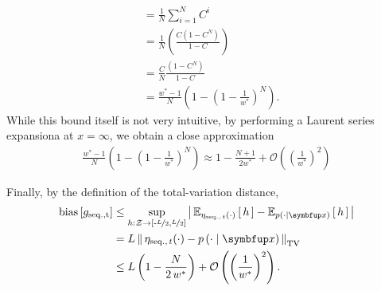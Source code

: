 \begin{proofEnd}
\begin{align}
    &=    \frac{1}{N} \sum_{i=1}^N C^i \\
    &=    \frac{1}{N} \left(\frac{ C \left(1 - C^{N}\right)}{1 - C}\right) \\
    &=    \frac{C}{N} \frac{ \left(1 - C^{N}\right) }{1 - C} \\
    &=  \frac{w^* - 1}{N} \left( 1 - {\left( 1 - \frac{1}{w^*} \right) }^N \right).
  \end{align}
  While this bound itself is not very intuitive, by performing a Laurent series expansiona at \(x = \infty\), we obtain a close approximation
  \begin{align}
    \frac{w^* - 1}{N} \left( 1 - {\left( 1 - \frac{1}{w^*} \right) }^N \right)
    \approx 1 - \frac{N+1}{2 w^*} + \mathcal{O}\left({\left(\frac{1}{w^*}\right)}^2\right)
  \end{align}

  Finally, by the definition of the total-variation distance, 
 \begin{align}
   \mathrm{bias}\left[ g_{\mathrm{seq., t}} \right]
   &\leq \sup_{h : \mathcal{Z} \rightarrow \left[ \text{-}\nicefrac{L}{2}, \nicefrac{L}{2} \right]} \left|\, \Esub{\eta_{\mathrm{seq.},\, t}(\cdot)}{h} - \Esub{p(\cdot\mid\vx)}{h} \,\right| \\
   &= L \, \DTV{ \eta_{\mathrm{seq.},\, t}(\cdot) }{p\left(\cdot\mid\vx\right)}  \\
   &\leq L \left( 1 - \frac{N}{2 \, w^*} \right) + \mathcal{O}\left({\left(\frac{1}{w^*}\right)}^2\right).
 \end{align}
\end{proofEnd}

